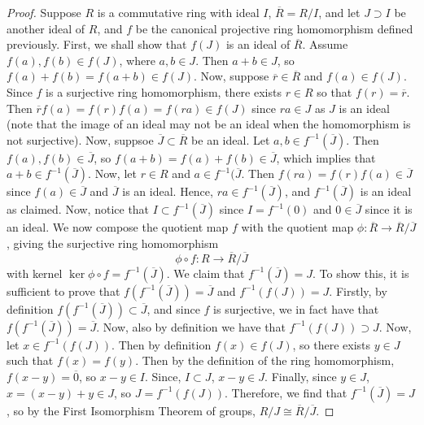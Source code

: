 \documentclass[12pt]{article}
\theoremstyle{definition}
\theoremstyle{remark}
\numberwithin{equation}{section}
\begin{document}
\begin{proof}
        Suppose $R$ is a commutative ring with ideal $I$, $\overline{R} = R/I$, and let $J \supset I$ be another ideal of $R$, and $f$ be the canonical projective ring homomorphism defined previously. First, we shall show that $f(J)$ is an ideal of $\overline{R}$. Assume $f(a),f(b) \in f(J)$, where $a,b \in J$. Then $a+b \in J$, so $f(a) + f(b) = f(a+b) \in f(J)$. Now, suppose $\overline{r} \in \overline{R}$ and $f(a) \in f(J)$. Since $f$ is a surjective ring homomorphism, there exists $r \in R$ so that $f(r) = \overline{r}$. Then $\overline{r}f(a) = f(r)f(a) = f(ra) \in f(J)$ since $ra \in J$ as $J$ is an ideal (note that the image of an ideal may not be an ideal when the homomorphism is not surjective). Now, suppsoe $\overline{J} \subset \overline{R}$ be an ideal. Let $a,b \in f^{-1}(\overline{J})$. Then $f(a),f(b) \in \overline{J}$, so $f(a+b) = f(a) + f(b) \in \overline{J}$, which implies that $a+b \in f^{-1}(\overline{J})$. Now, let $r \in R$ and $a \in f^{-1}(\overline{J}$. Then $f(ra) = f(r)f(a) \in \overline{J}$ since $f(a) \in \overline{J}$ and $\overline{J}$ is an ideal. Hence, $ra \in f^{-1}(\overline{J})$, and $f^{-1}(\overline{J})$ is an ideal as claimed. Now, notice that $I \subset f^{-1}(\overline{J})$ since $I = f^{-1}(0)$ and $0 \in \overline{J}$ since it is an ideal. We now compose the quotient map $f$ with the quotient map $\phi:\overline{R} \rightarrow \overline{R}/\overline{J}$, giving the surjective ring homomorphism \begin{equation}
                \phi \circ f: R \rightarrow \overline{R}/\overline{J}
        \end{equation}
        with kernel $\ker \phi\circ f=f^{-1}(\overline{J})$. We claim that $f^{-1}(\overline{J}) = J$. To show this, it is sufficient to prove that $f(f^{-1}(\overline{J})) = \overline{J}$ and $f^{-1}(f(J)) = J$. Firstly, by definition $f(f^{-1}(\overline{J})) \subset \overline{J}$, and since $f$ is surjective, we in fact have that $f(f^{-1}(\overline{J})) = \overline{J}$. Now, also by definition we have that $f^{-1}(f(J)) \supset J$. Now, let $x \in f^{-1}(f(J))$. Then by definition $f(x) \in f(J)$, so there exists $y \in J$ such that $f(x) = f(y)$. Then by the definition of the ring homomorphism, $f(x-y) = \overline{0}$, so $x-y \in I$. Since, $I \subset J$, $x-y \in J$. Finally, since $y \in J$, $x = (x-y)+y \in J$, so $J = f^{-1}(f(J))$. Therefore, we find that $f^{-1}(\overline{J}) = J$, so by the First Isomorphism Theorem of groups, $R/J \cong \overline{R}/\overline{J}$.
\end{proof}
\end{document}
